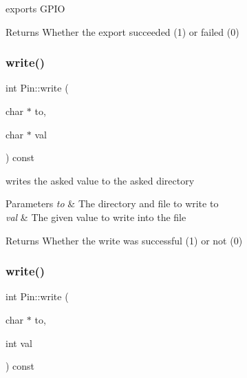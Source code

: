 exports G\+P\+IO 

\begin{DoxyReturn}{Returns}
Whether the export succeeded (1) or failed (0) 
\end{DoxyReturn}
\mbox{\label{classPin_a1ab3312c109c400607d3242f0463941b}} 
\subsubsection{\texorpdfstring{write()}{write()}\hspace{0.1cm}{\footnotesize\ttfamily [1/2]}}
{\footnotesize\ttfamily int Pin\+::write (\begin{DoxyParamCaption}\item[{char $\ast$}]{to,  }\item[{char $\ast$}]{val }\end{DoxyParamCaption}) const\hspace{0.3cm}{\ttfamily [private]}}



writes the asked value to the asked directory 


\begin{DoxyParams}{Parameters}
{\em to} & The directory and file to write to \\
\hline
{\em val} & The given value to write into the file \\
\hline
\end{DoxyParams}
\begin{DoxyReturn}{Returns}
Whether the write was successful (1) or not (0) 
\end{DoxyReturn}
\mbox{\label{classPin_a800322aedd71b00ea963876b6628be68}} 
\subsubsection{\texorpdfstring{write()}{write()}\hspace{0.1cm}{\footnotesize\ttfamily [2/2]}}
{\footnotesize\ttfamily int Pin\+::write (\begin{DoxyParamCaption}\item[{char $\ast$}]{to,  }\item[{int}]{val }\end{DoxyParamCaption}) const\hspace{0.3cm}{\ttfamily [private]}}



